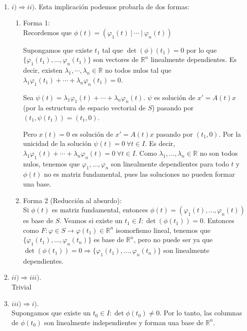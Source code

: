 \documentclass[11pt, a4paper,twoside]{article}
\makeatletter
\theoremstyle{theorem-style}  %
\renewenvironment{proof}[1][\proofname]{\par
	\pushQED{\qed}%
	\normalfont \topsep6\p@\@plus6\p@\relax
	\list{}{%
		\settowidth{\leftmargin}{\quad:\hskip\labelsep}%
		\setlength{\labelwidth}{0pt}%
		\setlength{\itemindent}{-\leftmargin}%
	}%
	\item[\hskip\labelsep\itshape#1\@addpunct{:}]\ignorespaces
}{%
	\popQED\endlist\@endpefalse
}
\theoremstyle{definition-style}
\theoremstyle{example-style}
\makeatother
\begin{document}
\begin{proof}\
	\begin{enumerate}
		\item $ i) \Rightarrow ii) $. Esta implicación podemos probarla de dos formas:
		\begin{enumerate}[\quad a)]
			\item Forma 1: \\
			Recordemos que $\phi (t)= (\varphi_1(t) \ | \ \cdots \ | \ \varphi_n(t)) $
			
			Supongamos que existe $ t_1 $ tal que  $ \det(\phi)(t_1)=0$ por lo que $\{ \varphi_1(t_1), \dots, \varphi_n(t_1) \} $ son vectores de $ \mathbb{R}^n  $ linealmente dependientes. Es decir, existen $ \lambda_1, \cdots, \lambda_n \in \mathbb{R}$ no todos nulos tal que $ \lambda_1 \varphi_1(t_1) + \cdots +\lambda_n\varphi_n(t_1)=0 $.
			
			Sea $ \psi(t)=\lambda_1 \varphi_1(t) + \cdots +\lambda_n\varphi_n(t) $. $ \psi $ es solución de $ x'=A(t)x $ (por la estructura de espacio vectorial de $ S $) pasando por $ (t_1,\psi(t_1))=(t_1,0) $.
			
			Pero $ x(t)=0 $ es solución de $ x'=A(t)x$ pasando por $ (t_1,0) $.
			Por la unicidad de la solución $ \psi(t)=0 \ \forall t \in I$. Es decir, $ \lambda_1 \varphi_1(t) + \cdots +\lambda_n\varphi_n(t) =0 \ \forall t \in I $. Como   $ \lambda_1, \dots, \lambda_n \in \mathbb{R}$ no son  todos nulos, tenemos que $ \varphi_1, \dots, \varphi_n $ son linealmente dependientes para todo $ t $ y $ \phi(t) $ no es matriz fundamental, pues las soluciones no pueden formar una base.
			\item Forma 2 (Reducción al absurdo): \\
			Si $ \phi(t) $ es matriz fundamental, entonces $ \phi(t)=(\varphi_1(t), ... , \varphi_n(t)) $ es base de $ S $.
			Veamos si existe un $ t_1 \in I : \det(\phi(t_1))=0$.
			Entonces como $ F:\varphi\in S\longrightarrow \varphi(t_1)\in  \mathbb{R}^n $ isomorfismo lineal, tenemos que $ \{ \varphi_1(t_1), \dots , \varphi_n(t_n) \}  $ es base de $ \mathbb{R}^n $, pero no puede ser ya que $ \det(\phi(t_1))=0 \Rightarrow \{ \varphi_1(t_1), \dots , \varphi_n(t_n) \} $ son linealmente dependientes.
		\end{enumerate}
	\item $ ii) \Rightarrow iii) $. \\
	Trivial
	\item $ iii) \Rightarrow i) $. \\
	Supongamos que existe un $ t_0 \in I : \det \phi (t_0)\neq 0 $. Por lo tanto, las columnas de $ \phi(t_0) $ son linealmente independientes y forman una base de $ \mathbb{R}^n $.
	

\end{enumerate}
\end{proof}
\end{document}
